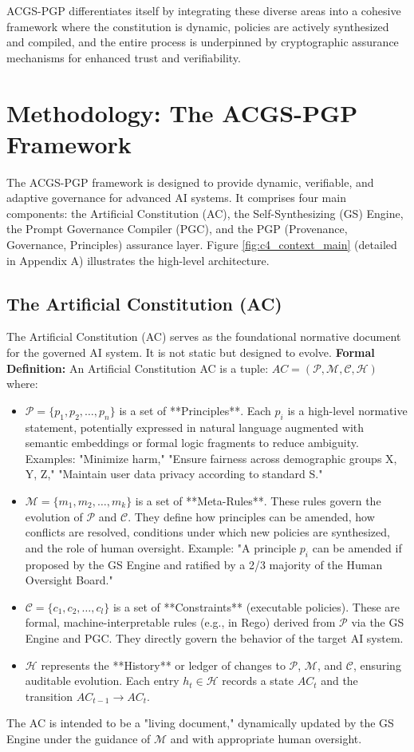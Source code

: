 \documentclass[sigconf,review,screen]{acmart}
\begin{document}
ACGS-PGP differentiates itself by integrating these diverse areas into a cohesive framework where the constitution is dynamic, policies are actively synthesized and compiled, and the entire process is underpinned by cryptographic assurance mechanisms for enhanced trust and verifiability.

\section{Methodology: The ACGS-PGP Framework}
The ACGS-PGP framework is designed to provide dynamic, verifiable, and adaptive governance for advanced AI systems. It comprises four main components: the Artificial Constitution (AC), the Self-Synthesizing (GS) Engine, the Prompt Governance Compiler (PGC), and the PGP (Provenance, Governance, Principles) assurance layer. Figure \ref{fig:c4_context_main} (detailed in Appendix A) illustrates the high-level architecture.

\subsection{The Artificial Constitution (AC)}
The Artificial Constitution (AC) serves as the foundational normative document for the governed AI system. It is not static but designed to evolve.
\vspace{0.5em}
\textbf{Formal Definition:} An Artificial Constitution AC is a tuple:
$AC = (\mathcal{P}, \mathcal{M}, \mathcal{C}, \mathcal{H})$
where:
\begin{itemize}
    \item $\mathcal{P} = \{p_1, p_2, \ldots, p_n\}$ is a set of **Principles**. Each $p_i$ is a high-level normative statement, potentially expressed in natural language augmented with semantic embeddings or formal logic fragments to reduce ambiguity. Examples: "Minimize harm," "Ensure fairness across demographic groups X, Y, Z," "Maintain user data privacy according to standard S."
    \item $\mathcal{M} = \{m_1, m_2, \ldots, m_k\}$ is a set of **Meta-Rules**. These rules govern the evolution of $\mathcal{P}$ and $\mathcal{C}$. They define how principles can be amended, how conflicts are resolved, conditions under which new policies are synthesized, and the role of human oversight. Example: "A principle $p_i$ can be amended if proposed by the GS Engine and ratified by a 2/3 majority of the Human Oversight Board."
    \item $\mathcal{C} = \{c_1, c_2, \ldots, c_l\}$ is a set of **Constraints** (executable policies). These are formal, machine-interpretable rules (e.g., in Rego) derived from $\mathcal{P}$ via the GS Engine and PGC. They directly govern the behavior of the target AI system.
    \item $\mathcal{H}$ represents the **History** or ledger of changes to $\mathcal{P}$, $\mathcal{M}$, and $\mathcal{C}$, ensuring auditable evolution. Each entry $h_t \in \mathcal{H}$ records a state $AC_t$ and the transition $AC_{t-1} \rightarrow AC_t$.
\end{itemize}
The AC is intended to be a "living document," dynamically updated by the GS Engine under the guidance of $\mathcal{M}$ and with appropriate human oversight.
\end{document}
